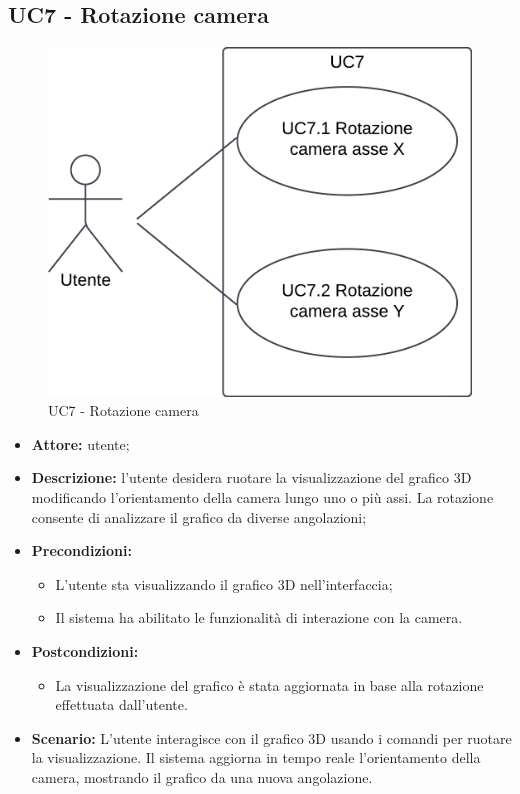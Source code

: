 \subsection{UC7 - Rotazione camera}
\begin{figure}[h!]
    \centering
    \includegraphics[scale=0.7]{template/images/UC7_7.1_7.2.png}
    \caption{UC7 - Rotazione camera}
\end{figure}
\begin{itemize}
    \item \textbf{Attore:} utente;
    \item \textbf{Descrizione:} l'utente desidera ruotare la visualizzazione del grafico 3D modificando l'orientamento della camera lungo uno o più assi. La rotazione consente di analizzare il grafico da diverse angolazioni;
    \item \textbf{Precondizioni:} 
    \begin{itemize}
        \item L'utente sta visualizzando il grafico 3D nell'interfaccia;
        \item Il sistema ha abilitato le funzionalità di interazione con la camera.
    \end{itemize}
    \item \textbf{Postcondizioni:} 
    \begin{itemize}
        \item La visualizzazione del grafico è stata aggiornata in base alla rotazione effettuata dall'utente.
    \end{itemize}
    \item \textbf{Scenario:}  
    L'utente interagisce con il grafico 3D usando i comandi per ruotare la visualizzazione. Il sistema aggiorna in tempo reale l'orientamento della camera, mostrando il grafico da una nuova angolazione.
\end{itemize}
